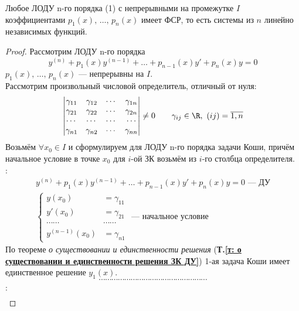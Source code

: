 \newpage
\begin{theorem}
    Любое ЛОДУ n-го порядка (1) с непрерывными на промежутке $I$ коэффициентами $p_1(x),\, \ldots,\, p_n(x)$ имеет ФСР, то есть системы из $n$ линейно независимых функций.
\end{theorem}
\begin{proof}
    Рассмотрим ЛОДУ n-го порядка
    \[
        y^{(n)} + p_1(x)y^{(n-1)} + \ldots + p_{n-1}(x) y' + p_n(x) y = 0
    \]
    $p_1(x),\, \ldots,\, p_n(x)$ --- непрерывны на $I$. \\
    Рассмотрим произвольный числовой определитель, отличный от нуля:
    \[
        \begin{vmatrix}
            \gamma_{11} & \gamma_{12} & \cdots & \gamma_{1n} \\
            \gamma_{21} & \gamma_{22} & \cdots & \gamma_{2n} \\
            \cdots & \cdots & \cdots & \cdots \\
            \gamma_{n1} & \gamma_{n2} & \cdots & \gamma_{nn}
        \end{vmatrix} \ne 0\qquad \gamma_{ij} \in \R,\ (ij) = \overline{1,n}
    \]
    Возьмём $\forall x_0 \in I$ и сформулируем для ЛОДУ n-го порядка задачи Коши, причём начальное условие в точке $x_0$ для $i$-ой ЗК возьмём из $i$-го столбца определителя.\\[1ex]
    : \vspace{-\topsep}
    \begin{gather*}
        y^{(n)} + p_1(x)y^{(n-1)} + \ldots + p_{n-1}(x) y' + p_n(x) y = 0\text{ --- ДУ}\\
        \left\{ \begin{aligned}
            y(x_0) &= \gamma_{11} \\
            y'(x_0) &= \gamma_{21}\\
            \cdots\cdots&\cdots\cdots \\
            y^{(n-1)}(x_0) &= \gamma_{n1} 
        \end{aligned}\right.\text{ --- начальное условие}
    \end{gather*}
    По теореме \textit{о существовании и единственности решения} (\textbf{Т.\ref{т: о существовании и единственности решения ЗК ДУ}}) 1-ая задача Коши имеет единственное решение $y_1(x)$. \\
    \[
        \cdots\cdots\cdots\cdots\cdots\cdots\cdots\cdots\cdots\cdots\cdots\cdots\cdots\cdots\cdots\cdots\cdots
    \]
    :
    \begin{gather*}

\end{gather*}
\end{proof}
